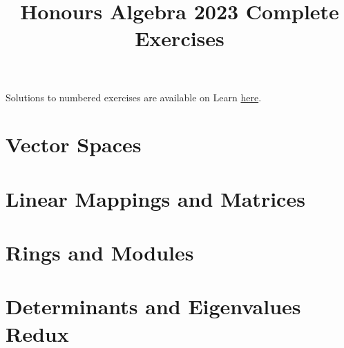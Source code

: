 \documentclass[a4paper]{article}
\title{Honours Algebra 2023 Complete Exercises}
\begin{document}
\maketitle

Solutions to numbered exercises are available on Learn \href{https://www.learn.ed.ac.uk/bbcswebdav/pid-8338476-dt-content-rid-33823325_1/xid-33823325_1}{here}.

\begin{enumerate}
  \section{Vector Spaces}
    
    
    
    
    
    

  \newpage
  \section{Linear Mappings and Matrices}
    
    
    
    

  \newpage
  \section{Rings and Modules}
    
    
    
    
    
    
    

  \newpage
  \section{Determinants and Eigenvalues Redux}
    
    
    
    
    
    
    
\end{enumerate}
\end{document}
